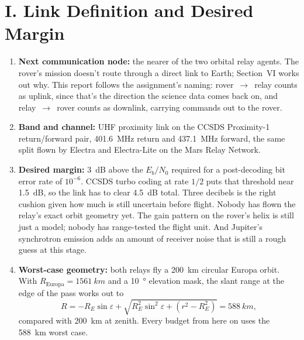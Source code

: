 \documentclass[11pt]{article}
\begin{document}
\section*{I. Link Definition and Desired Margin}

\begin{enumerate}[label=\alph*., leftmargin=*]
    \item \textbf{Next communication node:} the nearer of the two orbital relay agents. The rover's
    mission doesn't route through a direct link to Earth; Section~VI works out why. This report
    follows the assignment's naming: rover~$\rightarrow$~relay counts as uplink, since that's the
    direction the science data comes back on, and relay~$\rightarrow$~rover counts as downlink,
    carrying commands out to the rover.

    \item \textbf{Band and channel:} UHF proximity link on the CCSDS Proximity-1 return/forward
    pair, \SI{401.6}{MHz} return and \SI{437.1}{MHz} forward, the same split flown by Electra and
    Electra-Lite on the Mars Relay Network.

    \item \textbf{Desired margin:} \SI{3}{dB} above the $E_b/N_0$ required for a post-decoding bit
    error rate of $10^{-6}$. CCSDS turbo coding at rate $1/2$ puts that threshold near
    \SI{1.5}{dB}, so the link has to clear \SI{4.5}{dB} total. Three decibels is the right cushion
    given how much is still uncertain before flight. Nobody has flown the relay's exact orbit
    geometry yet. The gain pattern on the rover's helix is still just a model; nobody has
    range-tested the flight unit. And Jupiter's synchrotron emission adds an amount of receiver
    noise that is still a rough guess at this stage.

    \item \textbf{Worst-case geometry:} both relays fly a \SI{200}{km} circular Europa orbit. With
    $R_{\mathrm{Europa}} = \SI{1561}{km}$ and a \SI{10}{\degree} elevation mask, the slant range at
    the edge of the pass works out to
    \[
        R = -R_E \sin\varepsilon + \sqrt{R_E^2\sin^2\varepsilon + \left(r^2 - R_E^2\right)}
          = \SI{588}{km},
    \]
    compared with \SI{200}{km} at zenith. Every budget from here on uses the \SI{588}{km} worst case.
\end{enumerate}
\end{document}
